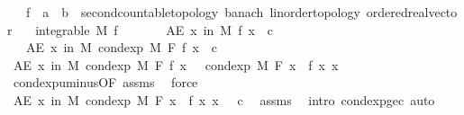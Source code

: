 \begin{isabellebody}
\ \ \ f\ {\isacharcolon}{\kern0pt}{\isacharcolon}{\kern0pt}\ {\isachardoublequoteopen}{\isacharprime}{\kern0pt}a\ {\isasymRightarrow}\ {\isacharprime}{\kern0pt}b\ {\isacharcolon}{\kern0pt}{\isacharcolon}{\kern0pt}\ {\isacharbraceleft}{\kern0pt}second{\isacharunderscore}{\kern0pt}countable{\isacharunderscore}{\kern0pt}topology{\isacharcomma}{\kern0pt}\ banach{\isacharcomma}{\kern0pt}\ linorder{\isacharunderscore}{\kern0pt}topology{\isacharcomma}{\kern0pt}\ ordered{\isacharunderscore}{\kern0pt}real{\isacharunderscore}{\kern0pt}vector{\isacharbraceright}{\kern0pt}{\isachardoublequoteclose}\isanewline
\ \ \ {\isachardoublequoteopen}integrable\ M\ f{\isachardoublequoteclose}\isanewline
\ \ \ \ \ \ \ {\isachardoublequoteopen}AE\ x\ in\ M{\isachardot}{\kern0pt}\ f\ x\ {\isasymle}\ c{\isachardoublequoteclose}\isanewline
\ \ \ {\isachardoublequoteopen}AE\ x\ in\ M{\isachardot}{\kern0pt}\ cond{\isacharunderscore}{\kern0pt}exp\ M\ F\ f\ x\ {\isasymle}\ c{\isachardoublequoteclose}\isanewline
%
\isadelimproof
%
\endisadelimproof
%
\isatagproof
{}\isamarkupfalse%
\ {\isacharminus}{\kern0pt}\isanewline
\ \ \isamarkupfalse%
\ {\isachardoublequoteopen}AE\ x\ in\ M{\isachardot}{\kern0pt}\ cond{\isacharunderscore}{\kern0pt}exp\ M\ F\ f\ x\ {\isacharequal}{\kern0pt}\ {\isacharminus}{\kern0pt}\ cond{\isacharunderscore}{\kern0pt}exp\ M\ F\ {\isacharparenleft}{\kern0pt}{\isasymlambda}x{\isachardot}{\kern0pt}\ {\isacharminus}{\kern0pt}\ f\ x{\isacharparenright}{\kern0pt}\ x{\isachardoublequoteclose}\ \isamarkupfalse%
\ cond{\isacharunderscore}{\kern0pt}exp{\isacharunderscore}{\kern0pt}uminus{\isacharbrackleft}{\kern0pt}OF\ assms{\isacharparenleft}{\kern0pt}{}{\isacharparenright}{\kern0pt}{\isacharbrackright}{\kern0pt}\ \isamarkupfalse%
\ force\isanewline
\ \ \isamarkupfalse%
\ \isamarkupfalse%
\ {\isachardoublequoteopen}AE\ x\ in\ M{\isachardot}{\kern0pt}\ cond{\isacharunderscore}{\kern0pt}exp\ M\ F\ {\isacharparenleft}{\kern0pt}{\isasymlambda}x{\isachardot}{\kern0pt}\ {\isacharminus}{\kern0pt}\ f\ x{\isacharparenright}{\kern0pt}\ x\ {\isasymge}\ {\isacharminus}{\kern0pt}\ c{\isachardoublequoteclose}\ \isamarkupfalse%
\ assms\ \isamarkupfalse%
\ {\isacharparenleft}{\kern0pt}intro\ cond{\isacharunderscore}{\kern0pt}exp{\isacharunderscore}{\kern0pt}ge{\isacharunderscore}{\kern0pt}c{\isacharparenright}{\kern0pt}\ auto\isanewline
\ \ \isamarkupfalse%

\end{isabellebody}
